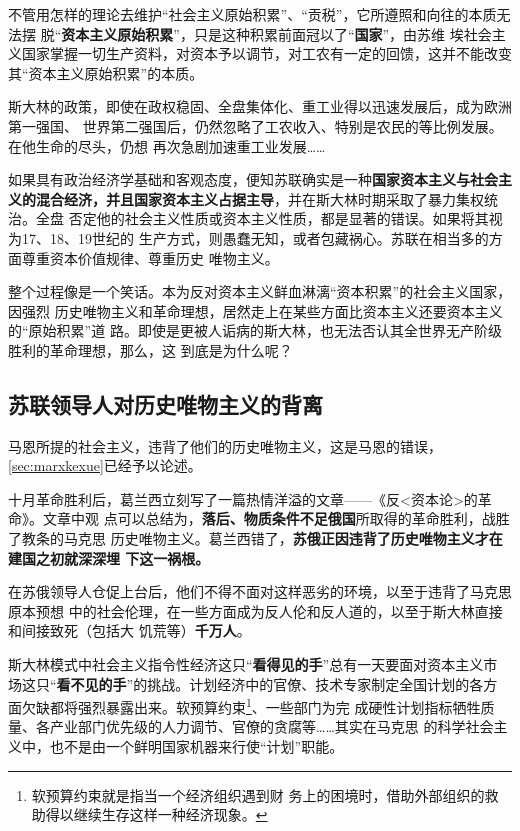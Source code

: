 不管用怎样的理论去维护``社会主义原始积累''、``贡税''，它所遵照和向往的本质无法摆
脱``\textbf{资本主义原始积累}''，只是这种积累前面冠以了``\textbf{国家}''，由苏维
埃社会主义国家掌握一切生产资料，对资本予以调节，对工农有一定的回馈，这并不能改变
其``资本主义原始积累''的本质。

斯大林的政策，即使在政权稳固、全盘集体化、重工业得以迅速发展后，成为欧洲第一强国、
世界第二强国后，仍然忽略了工农收入、特别是农民的等比例发展。在他生命的尽头，仍想
再次急剧加速重工业发展……

如果具有政治经济学基础和客观态度，便知苏联确实是一种\textbf{国家资本主义与社会主
  义的混合经济，并且国家资本主义占据主导}，并在斯大林时期采取了暴力集权统治。全盘
否定他的社会主义性质或资本主义性质，都是显著的错误。如果将其视为17、18、19世纪的
生产方式，则愚蠢无知，或者包藏祸心。苏联在相当多的方面尊重资本价值规律、尊重历史
唯物主义。

整个过程像是一个笑话。本为反对资本主义鲜血淋漓``资本积累''的社会主义国家，因强烈
历史唯物主义和革命理想，居然走上在某些方面比资本主义还要资本主义的``原始积累''道
路。即使是更被人诟病的斯大林，也无法否认其全世界无产阶级胜利的革命理想，那么，这
到底是为什么呢？

\subsection{苏联领导人对历史唯物主义的背离}
\label{sec:beili}

马恩所提的社会主义，违背了他们的历史唯物主义，这是马恩的错误，\cref{sec:marxkexue}已经予以论述。

十月革命胜利后，葛兰西立刻写了一篇热情洋溢的文章——《反<资本论>的革命》。文章中观
点可以总结为，\textbf{落后、物质条件不足俄国}所取得的革命胜利，战胜了教条的马克思
历史唯物主义。葛兰西错了，\textbf{苏俄正因违背了历史唯物主义才在建国之初就深深埋
  下这一祸根。}

在苏俄领导人仓促上台后，他们不得不面对这样恶劣的环境，以至于违背了马克思原本预想
中的社会伦理，在一些方面成为反人伦和反人道的，以至于斯大林直接和间接致死（包括大
饥荒等）\textbf{千万人}。

斯大林模式中社会主义指令性经济这只``\textbf{看得见的手}''总有一天要面对资本主义市
场这只“\textbf{看不见的手}”的挑战。计划经济中的官僚、技术专家制定全国计划的各方
面欠缺都将强烈暴露出来。软预算约束\footnote{软预算约束就是指当一个经济组织遇到财
  务上的困境时，借助外部组织的救助得以继续生存这样一种经济现象。}、一些部门为完
成硬性计划指标牺牲质量、各产业部门优先级的人力调节、官僚的贪腐等……其实在马克思
的科学社会主义中，也不是由一个鲜明国家机器来行使``计划''职能。

